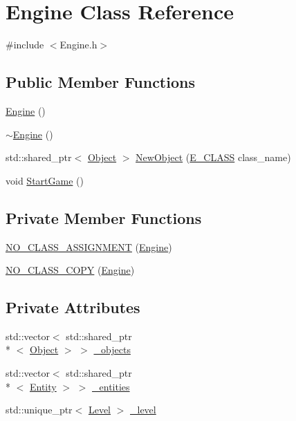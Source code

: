 \section{Engine Class Reference}
\label{class_engine}


{\ttfamily \#include $<$Engine.\-h$>$}

\subsection*{Public Member Functions}
\begin{DoxyCompactItemize}
\item 
\hyperlink{class_engine_a8c98683b0a3aa28d8ab72a8bcd0d52f2}{Engine} ()
\item 
\hyperlink{class_engine_a8ef7030a089ecb30bbfcb9e43094717a}{$\sim$\-Engine} ()
\item 
std\-::shared\-\_\-ptr$<$ \hyperlink{class_object}{Object} $>$ \hyperlink{class_engine_aa613f98a07dcb2fb9de92d8797b1af12}{New\-Object} (\hyperlink{_engine_8h_ab1adc9d93c99be93f3e5394277110aa9}{E\-\_\-\-C\-L\-A\-S\-S} class\-\_\-name)
\item 
void \hyperlink{class_engine_ad6469358103aef60e7f27354c134308f}{Start\-Game} ()
\end{DoxyCompactItemize}
\subsection*{Private Member Functions}
\begin{DoxyCompactItemize}
\item 
\hyperlink{class_engine_ab0d1aa8f4b87400b7bbcc96d3f3c17fd}{N\-O\-\_\-\-C\-L\-A\-S\-S\-\_\-\-A\-S\-S\-I\-G\-N\-M\-E\-N\-T} (\hyperlink{class_engine}{Engine})
\item 
\hyperlink{class_engine_a63470071f13af89c46a43febd819e3dc}{N\-O\-\_\-\-C\-L\-A\-S\-S\-\_\-\-C\-O\-P\-Y} (\hyperlink{class_engine}{Engine})
\end{DoxyCompactItemize}
\subsection*{Private Attributes}
\begin{DoxyCompactItemize}
\item 
std\-::vector$<$ std\-::shared\-\_\-ptr\\*
$<$ \hyperlink{class_object}{Object} $>$ $>$ \hyperlink{class_engine_a5c65cb06c180f149b18e81c1beb2f945}{\-\_\-objects}
\item 
std\-::vector$<$ std\-::shared\-\_\-ptr\\*
$<$ \hyperlink{class_entity}{Entity} $>$ $>$ \hyperlink{class_engine_a90ecd2e19f67f9996f1aec37d5705db4}{\-\_\-entities}
\item 
std\-::unique\-\_\-ptr$<$ \hyperlink{class_level}{Level} $>$ \hyperlink{class_engine_a5bb30d48525cf6b261baaa2b89d84934}{\-\_\-level}
\end{DoxyCompactItemize}
